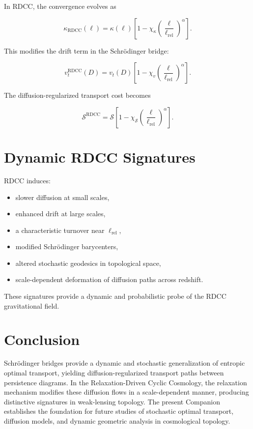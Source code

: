 \documentclass[11pt,a4paper]{article}
\begin{document}
In RDCC, the convergence evolves as

\begin{equation}
    \kappa_{\mathrm{RDCC}}(\ell)
    = \kappa(\ell)
      \left[
        1 - \chi_{\kappa}
        \left(\frac{\ell}{\ell_{\mathrm{rel}}}\right)^{\alpha}
      \right].
\end{equation}

This modifies the drift term in the Schrödinger bridge:

\begin{equation}
    v^{\mathrm{RDCC}}_{t}(D)
    = v_{t}(D)
      \left[
        1 - \chi_{v}
        \left(\frac{\ell}{\ell_{\mathrm{rel}}}\right)^{\alpha}
      \right].
\end{equation}

The diffusion-regularized transport cost becomes

\begin{equation}
    \mathcal{S}^{\mathrm{RDCC}}
    = \mathcal{S}
      \left[
        1 - \chi_{\mathcal{S}}
        \left(\frac{\ell}{\ell_{\mathrm{rel}}}\right)^{\alpha}
      \right].
\end{equation}
\section{Dynamic RDCC Signatures}

RDCC induces:

\begin{itemize}
    \item slower diffusion at small scales,
    \item enhanced drift at large scales,
    \item a characteristic turnover near $\ell_{\mathrm{rel}}$,
    \item modified Schrödinger barycenters,
    \item altered stochastic geodesics in topological space,
    \item scale-dependent deformation of diffusion paths across redshift.
\end{itemize}

These signatures provide a dynamic and probabilistic probe of the RDCC 
gravitational field.
\section{Conclusion}

Schrödinger bridges provide a dynamic and stochastic generalization of entropic 
optimal transport, yielding diffusion-regularized transport paths between 
persistence diagrams. In the Relaxation-Driven Cyclic Cosmology, the relaxation 
mechanism modifies these diffusion flows in a scale-dependent manner, producing 
distinctive signatures in weak-lensing topology. The present Companion establishes 
the foundation for future studies of stochastic optimal transport, diffusion 
models, and dynamic geometric analysis in cosmological topology.


\nocite{*}

\end{document}
